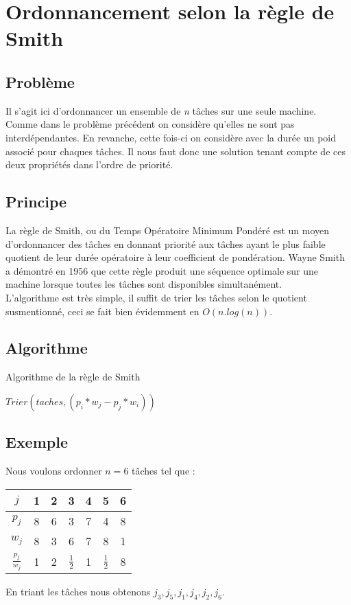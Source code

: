\section{Ordonnancement selon la règle de Smith}
\subsection{Problème}
Il s'agit ici d'ordonnancer un ensemble de {\em n} tâches sur une seule machine.
Comme dans le problème précédent on considère qu'elles ne sont pas
interdépendantes. En revanche, cette fois-ci on considère avec la durée un poid
associé pour chaques tâches. Il nous faut donc une solution tenant compte de ces
deux propriétés dans l'ordre de priorité. 
 
\subsection{Principe}
La règle de Smith, ou du Temps Opératoire Minimum Pondéré est un moyen 
d'ordonnancer des tâches en donnant priorité aux tâches ayant le plus faible 
quotient de leur durée opératoire à leur coefficient de pondération. Wayne Smith 
a démontré en 1956 que cette règle produit une séquence optimale sur une machine 
lorsque toutes les tâches sont disponibles simultanément.\\
L'algorithme est très simple, il suffit de trier les tâches selon le quotient 
susmentionné, ceci se fait bien évidemment en $O(n.log(n))$.

\subsection{Algorithme}
\begin{algorithm}
\caption{Algorithme de la règle de Smith}
\begin{algorithmic}
\STATE $Trier(taches, (p_i*w_j - p_j*w_i))$
\end{algorithmic}
\end{algorithm}

\subsection{Exemple}
Nous voulons ordonner $n = 6$ tâches tel que :
\begin{center}
\begin{tabular}{|c|c|c|c|c|c|c|}
\hline
$j$ & 1 & 2 & 3 & 4 & 5 & 6  \\
\hline
$p_j$ & 8 & 6 & 3 & 7 & 4 & 8  \\
$w_j$ & 8 & 3 & 6 & 7 & 8 & 1  \\
\hline
$\frac{p_j}{w_j}$ & 1 & 2 & $\frac{1}{2}$ & 1 & $\frac{1}{2}$ & 8 \\
\hline
\end{tabular}
\end{center}
En triant les tâches nous obtenons $j_3,j_5,j_1,j_4,j_2,j_6$.

